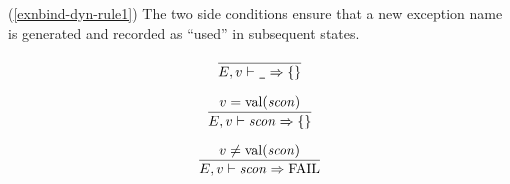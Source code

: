 \replacement{\theidstatus}{
\begin{equation}	%
\frac{\E(\longexn)=\e\qquad
      \langle\E\ts\exnbind\ra\EE\rangle }
     {\E\ts\longexnbindb\ra\{\exn\mapsto\e\}\langle +\ \EE\rangle}
\end{equation}}{\begin{equation}	%
\frac{\E(\longvid)=(\e,\ise)\qquad
      \langle\E\ts\exnbind\ra\VE\rangle }
     {\E\ts\longvidexnbindb\ra\{\vid\mapsto(\e,\ise)\}\langle +\ \VE\rangle}
\end{equation}}
\comments
\begin{description}
\item{(\ref{exnbind-dyn-rule1})}
  The two side conditions ensure that a new exception name is generated and
recorded as ``used'' in subsequent states.
\end{description}
%
%
\begin{equation}	%
\frac{}
     {\E,\V\ts\wildpat\ra \emptymap}\index{55.3}
\end{equation}

\begin{equation}	%
\frac{\V=\sconval(\scon)}
     {\E,\V\ts\scon\ra \emptymap}\index{55.35}
\end{equation}

\begin{equation}	%
\label{sconpat-dyn-rule2}
\frac{\V\neq\sconval(\scon)}
     {\E,\V\ts\scon\ra \FAIL}\index{55.36}
\end{equation}



